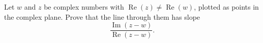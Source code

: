 Let $w$ and $z$ be complex numbers with $\operatorname{Re}(z)\ne\operatorname{Re}(w)$, plotted as points in the complex plane. Prove that the line through them has slope
\[
\dfrac{\operatorname{Im}(z-w)}{\operatorname{Re}(z-w)} .
\]
